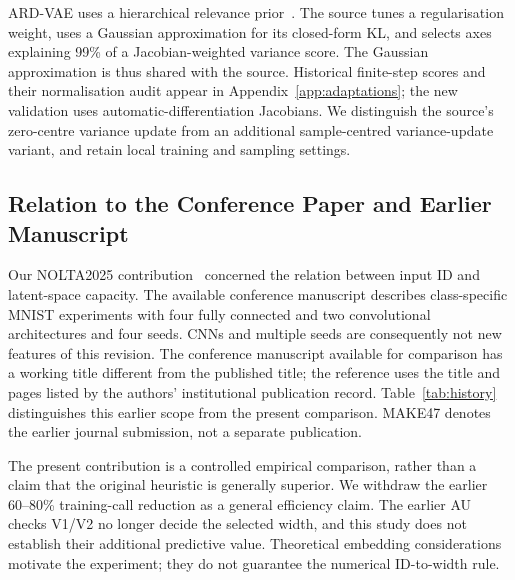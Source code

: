 ARD-VAE uses a hierarchical relevance prior~\cite{saha2025ardvae}.
The source tunes a regularisation weight, uses a Gaussian approximation
for its closed-form KL, and selects axes explaining 99\% of a
Jacobian-weighted variance score. The Gaussian approximation is thus
shared with the source. Historical finite-step scores and their
normalisation audit appear in Appendix~\ref{app:adaptations}; the new
validation uses automatic-differentiation Jacobians. We distinguish the
source's zero-centre variance update from an additional sample-centred
variance-update variant, and retain local training and sampling settings.

\subsection{Relation to the Conference Paper and Earlier Manuscript}
Our NOLTA2025 contribution~\cite{obata2025manifold} concerned the relation
between input ID and latent-space capacity. The available conference
manuscript describes class-specific MNIST experiments with four fully
connected and two convolutional architectures and four seeds. CNNs and
multiple seeds are consequently not new features of this revision.
The conference manuscript available for comparison has a working title
different from the published title; the reference uses the title and
pages listed by the authors' institutional publication record.
Table~\ref{tab:history} distinguishes this earlier scope from the present
comparison. MAKE47 denotes the earlier journal submission, not a separate
publication.

The present contribution is a controlled empirical comparison, rather
than a claim that the original heuristic is generally superior.
We withdraw the earlier 60--80\% training-call reduction as a general
efficiency claim. The earlier AU checks V1/V2 no longer decide the
selected width, and this study does not establish their additional
predictive value. Theoretical embedding considerations motivate the
experiment; they do not guarantee the numerical ID-to-width rule.


